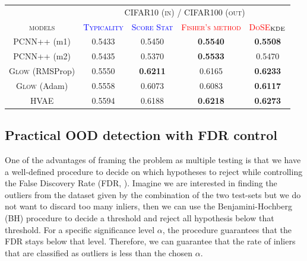{\begin{table}[t]
{\begin{tabular}{ccccc}
            \toprule
            &\multicolumn{4}{c}{\textsc{CIFAR10 (in) / CIFAR100 (out)}}\\
            \cmidrule{2-5}
            \textsc{models}  & \textcolor{blue}{\textsc{Typicality}} & \textcolor{blue}{\textsc{Score Stat}} & \textcolor{red}{\textsc{Fisher's method}} & \textcolor{red}{\textsc{DoSE$_{\textup{KDE}}$}} \\
            \midrule
            \textsc{PCNN++} (m1) &  0.5433 & 0.5450 &  \textbf{0.5540} &  \textbf{0.5508}\\
            \textsc{PCNN++} (m2) &  0.5435 &  0.5370 &  \textbf{0.5533} & 0.5470 \\
            \textsc{Glow} (RMSProp)  & 0.5550 &  \textbf{0.6211}  & 0.6165 &  \textbf{0.6233}\\
            \textsc{Glow} (Adam) & 0.5558  &   0.6073 & 0.6083 &   \textbf{0.6117}\\
            \textsc{HVAE} & 0.5594  & 0.6188  &  \textbf{0.6218} & \textbf{0.6273} \\
            \bottomrule
        \end{tabular}
        \label{tab_modelagnostic:two_sample_results}
    }
    \vspace*{-\baselineskip}
\end{table}


\subsection{Practical OOD detection with FDR control}
One of the advantages of framing the problem as multiple testing is that we have a well-defined procedure to decide on which hypotheses to reject while controlling the False Discovery Rate (FDR, \citealp{benjamini_controlling_1995}). Imagine we are interested in finding the outliers from the dataset given by the combination of the two test-sets but we do not want to discard too many inliers, then we can use the Benjamini-Hochberg (BH) procedure \parencite{benjamini_controlling_1995} to decide a threshold and reject all hypothesis below that threshold. For a specific significance level $\alpha$, the procedure guarantees that the FDR stays below that level. Therefore, we can guarantee that the rate of inliers that are classified as outliers is less than the chosen $\alpha$.


}
